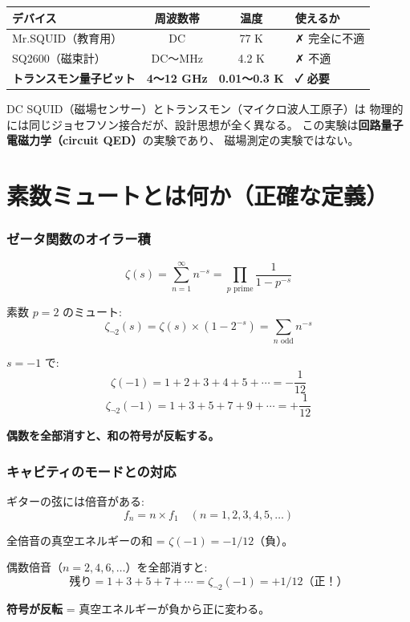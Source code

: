 \documentclass[12pt,a4paper]{article}
\begin{document}
\begin{dangerbox}
\begin{center}
\begin{tabular}{lccl}
\toprule
デバイス & 周波数帯 & 温度 & 使えるか \\
\midrule
Mr.SQUID（教育用） & DC & 77 K & ✗ 完全に不適 \\
SQ2600（磁束計） & DC〜MHz & 4.2 K & ✗ 不適 \\
\textbf{トランスモン量子ビット} & \textbf{4〜12 GHz} & \textbf{0.01〜0.3 K} & \textbf{✓ 必要} \\
\bottomrule
\end{tabular}
\end{center}
DC SQUID（磁場センサー）とトランスモン（マイクロ波人工原子）は
物理的には同じジョセフソン接合だが、設計思想が全く異なる。
この実験は\textbf{回路量子電磁力学（circuit QED）}の実験であり、
磁場測定の実験ではない。
\end{dangerbox}

\part{素数ミュートとは何か（正確な定義）}

\section{ゼータ関数のオイラー積}

\begin{mathbox}[正確な定義]
$$\zeta(s) = \sum_{n=1}^{\infty} n^{-s} = \prod_{p\text{ prime}} \frac{1}{1-p^{-s}}$$

素数 $p=2$ のミュート:
$$\zeta_{\neg 2}(s) = \zeta(s) \times (1-2^{-s}) = \sum_{n\text{ odd}} n^{-s}$$

$s = -1$ で:
$$\zeta(-1) = 1+2+3+4+5+\cdots = -\frac{1}{12}$$
$$\zeta_{\neg 2}(-1) = 1+3+5+7+9+\cdots = +\frac{1}{12}$$

\textbf{偶数を全部消すと、和の符号が反転する。}
\end{mathbox}

\section{キャビティのモードとの対応}

\begin{storybox}[ギターの弦のたとえ]
ギターの弦には倍音がある:
$$f_n = n \times f_1 \quad (n = 1, 2, 3, 4, 5, \ldots)$$

全倍音の真空エネルギーの和 = $\zeta(-1) = -1/12$（負）。

偶数倍音（$n=2,4,6,\ldots$）を全部消すと:
$$\text{残り} = 1 + 3 + 5 + 7 + \cdots = \zeta_{\neg 2}(-1) = +1/12 \text{（正！）}$$

\textbf{符号が反転} = 真空エネルギーが負から正に変わる。
\end{storybox}
\end{document}
